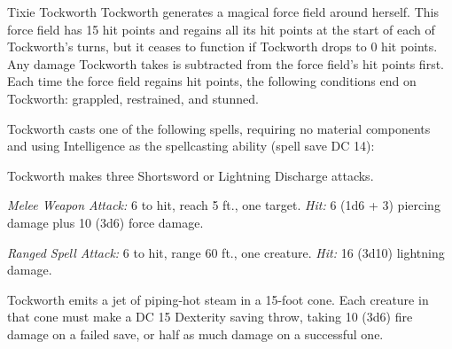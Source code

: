 \documentclass[10pt,a4paper,twoside,bg=print,twocolumn,openany,nodeprecatedcode]{dndbook}
\begin{document}
\begin{DndMonster}[float=t]{Tixie Tockworth}
\DndMonsterBasics[
armor-class = {17 (natural armor)},
hit-points = {\DndDice{10d6 + 40}},
speed = {30 ft.}
]
\DndMonsterAbilityScores[
 str = 16,
 dex = 13,
 con = 18,
 int = 17,
 wis = 9,
 cha = 10
]
\DndMonsterDetails[
saving-throws = {Int +6, Wis +2},
skills = {Arcana +9, Perception +2},
senses = {truesight 60 ft., passive perception 12},
languages = {Common, Gnomish, Terran, Undercommon},
challenge = 7,
]
Tockworth generates a magical force field around herself. This force field has 15 hit points and regains all its hit points at the start of each of Tockworth's turns, but it ceases to function if Tockworth drops to 0 hit points. Any damage Tockworth takes is subtracted from the force field's hit points first. Each time the force field regains hit points, the following conditions end on Tockworth: grappled, restrained, and stunned.

Tockworth casts one of the following spells, requiring no material components and using Intelligence as the spellcasting ability (spell save DC 14):
\begin{DndMonsterSpells}
\end{DndMonsterSpells}
Tockworth makes three Shortsword or Lightning Discharge attacks.

\textsl{Melee Weapon Attack:} 6 to hit, reach 5 ft., one target. \textsl{Hit:} 6 (1d6 + 3) piercing damage plus 10 (3d6) force damage.

\textsl{Ranged Spell Attack:} 6 to hit, range 60 ft., one creature. \textsl{Hit:} 16 (3d10) lightning damage.

Tockworth emits a jet of piping-hot steam in a 15-foot cone. Each creature in that cone must make a DC 15 Dexterity saving throw, taking 10 (3d6) fire damage on a failed save, or half as much damage on a successful one.

\end{DndMonster}
\end{document}
